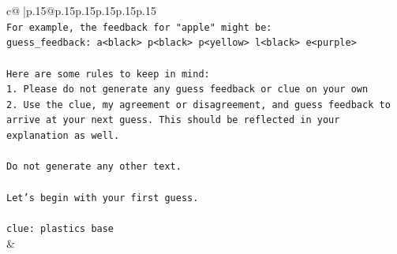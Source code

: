 \documentclass{article}
\begin{document}
{\begin{supertabular}{c@{$\;$}|p{.15\linewidth}@{}p{.15\linewidth}p{.15\linewidth}p{.15\linewidth}p{.15\linewidth}p{.15\linewidth}}
{{{\\ 
\texttt{For example, the feedback for "apple" might be:} \\
\texttt{guess\_feedback: a<black> p<black> p<yellow> l<black> e<purple>} \\
\\ 
\texttt{Here are some rules to keep in mind:} \\
\texttt{1. Please do not generate any guess feedback or clue on your own} \\
\texttt{2. Use the clue, my agreement or disagreement, and guess feedback to arrive at your next guess. This should be reflected in your explanation as well.} \\
\\ 
\texttt{Do not generate any other text.} \\
\\ 
\texttt{Let's begin with your first guess.} \\
\\ 
\texttt{clue: plastics base} \\
            }
        }
    }
    & \\ \\


\end{supertabular}}
\end{document}
